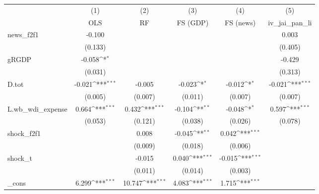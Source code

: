 {
\def\sym#1{\ifmmode^{#1}\else\(^{#1}\)\fi}
\begin{tabular}{l*{5}{c}}
\toprule
            &\multicolumn{1}{c}{(1)}&\multicolumn{1}{c}{(2)}&\multicolumn{1}{c}{(3)}&\multicolumn{1}{c}{(4)}&\multicolumn{1}{c}{(5)}\\
            &\multicolumn{1}{c}{OLS}&\multicolumn{1}{c}{RF}&\multicolumn{1}{c}{FS (GDP)}&\multicolumn{1}{c}{FS (news)}&\multicolumn{1}{c}{iv\_jai\_pan\_li}\\
\midrule
news\_f2f1   &      -0.100         &                     &                     &                     &       0.003         \\
            &     (0.133)         &                     &                     &                     &     (0.405)         \\
\addlinespace
gRGDP       &      -0.058\sym{*}  &                     &                     &                     &      -0.429         \\
            &     (0.031)         &                     &                     &                     &     (0.313)         \\
\addlinespace
D.tot       &      -0.021\sym{***}&      -0.005         &      -0.023\sym{*}  &      -0.012\sym{*}  &      -0.021\sym{***}\\
            &     (0.005)         &     (0.007)         &     (0.011)         &     (0.007)         &     (0.007)         \\
\addlinespace
L.wb\_wdi\_expense&       0.664\sym{***}&       0.432\sym{***}&      -0.104\sym{**} &      -0.048\sym{*}  &       0.597\sym{***}\\
            &     (0.053)         &     (0.121)         &     (0.038)         &     (0.026)         &     (0.078)         \\
\addlinespace
shock\_f2f1  &                     &       0.008         &      -0.045\sym{**} &       0.042\sym{***}&                     \\
            &                     &     (0.009)         &     (0.018)         &     (0.006)         &                     \\
\addlinespace
shock\_t     &                     &      -0.015         &       0.040\sym{***}&      -0.015\sym{***}&                     \\
            &                     &     (0.011)         &     (0.014)         &     (0.003)         &                     \\
\addlinespace
\_cons      &       6.299\sym{***}&      10.747\sym{***}&       4.083\sym{***}&       1.715\sym{***}&                     \\

\end{tabular}}
